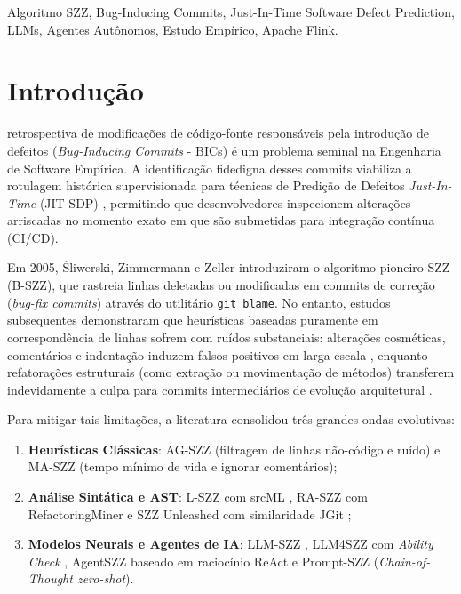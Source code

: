 \documentclass[10pt,journal,compsoc]{IEEEtran}
\begin{document}
{\begin{IEEEkeywords}
Algoritmo SZZ, Bug-Inducing Commits, Just-In-Time Software Defect Prediction, LLMs, Agentes Autônomos, Estudo Empírico, Apache Flink.
\end{IEEEkeywords}}

\maketitle
\IEEEdisplaynontitleabstractindextext
\IEEEpeerreviewmaketitle

\section{Introdução}
 retrospectiva de modificações de código-fonte responsáveis pela introdução de defeitos (\textit{Bug-Inducing Commits} - BICs) é um problema seminal na Engenharia de Software Empírica. A identificação fidedigna desses commits viabiliza a rotulagem histórica supervisionada para técnicas de Predição de Defeitos \textit{Just-In-Time} (JIT-SDP) \cite{kamei2013large}, permitindo que desenvolvedores inspecionem alterações arriscadas no momento exato em que são submetidas para integração contínua (CI/CD).

Em 2005, Śliwerski, Zimmermann e Zeller \cite{sliwerski2005changes} introduziram o algoritmo pioneiro SZZ (B-SZZ), que rastreia linhas deletadas ou modificadas em commits de correção (\textit{bug-fix commits}) através do utilitário \texttt{git blame}. No entanto, estudos subsequentes demonstraram que heurísticas baseadas puramente em correspondência de linhas sofrem com ruídos substanciais: alterações cosméticas, comentários e indentação induzem falsos positivos em larga escala \cite{dacosta2017evaluating}, enquanto refatorações estruturais (como extração ou movimentação de métodos) transferem indevidamente a culpa para commits intermediários de evolução arquitetural \cite{neto2018impact}.

Para mitigar tais limitações, a literatura consolidou três grandes ondas evolutivas:
\begin{enumerate}
    \item \textbf{Heurísticas Clássicas}: AG-SZZ \cite{kim2006automatic} (filtragem de linhas não-código e ruído) e MA-SZZ \cite{dacosta2017evaluating} (tempo mínimo de vida e ignorar comentários);
    \item \textbf{Análise Sintática e AST}: L-SZZ com srcML \cite{rosa2021evaluating}, RA-SZZ com RefactoringMiner \cite{fan2021impact} e SZZ Unleashed com similaridade JGit \cite{borg2019szz};
    \item \textbf{Modelos Neurais e Agentes de IA}: LLM-SZZ \cite{fan2024vulnerability}, LLM4SZZ com \textit{Ability Check} \cite{tang2025llm4szz}, AgentSZZ baseado em raciocínio ReAct \cite{risse2026agentszz} e Prompt-SZZ (\textit{Chain-of-Thought zero-shot}).
\end{enumerate}
\end{document}

